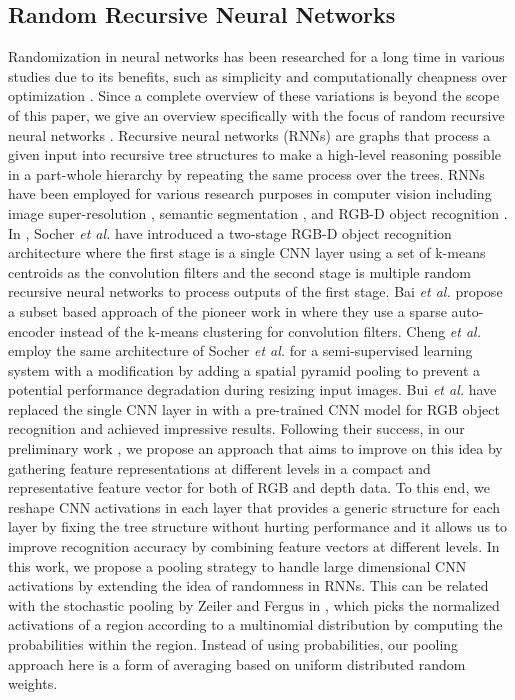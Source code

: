 \documentclass[10pt,journal,compsoc]{IEEEtran}
\begin{document}
\subsection{Random Recursive Neural Networks}
Randomization in neural networks has been researched for a long time in various studies \cite{Schmidt_ICPR_1992, Pao_Computer_1992, Pao_Neurocomp_1994, Igelnik_Pao_TNN_1995, Huang_TNN_2006, Rahimi_NIPS_2008, Socher_NIPS_2012} due to its benefits, such as simplicity and computationally cheapness over optimization \cite{Rahimi_NIPS_2009}. Since a complete overview of these variations is beyond the scope of this paper, we give an overview specifically with the focus of random recursive neural networks \cite{Socher_NIPS_2012}. Recursive neural networks (RNNs) \cite{Pollack_AI_1990, Hinton_AI_1990, Socher_ICML_2011} are graphs that process a given input into recursive tree structures to make a high-level reasoning possible in a part-whole hierarchy by repeating the same process over the trees. RNNs have been employed for various research purposes in computer vision including image super-resolution \cite{Kim_CVPR_2016}, semantic segmentation \cite{Socher_ICML_2011, Sharma_NIPS_2014}, and RGB-D object recognition \cite{Socher_NIPS_2012, Bai_Neurocomp_2015, Cheng_CVIU_2015}. In \cite{Socher_NIPS_2012}, Socher \textit{et al.} have introduced a two-stage RGB-D object recognition architecture where the first stage is a single CNN layer using a set of k-means centroids as the convolution filters and the second stage is multiple random recursive neural networks to process outputs of the first stage. Bai \textit{et al.} \cite{Bai_Neurocomp_2015} propose a subset based approach of the pioneer work in \cite{Socher_NIPS_2012} where they use a sparse auto-encoder instead of the k-means clustering for convolution filters. Cheng \textit{et al.} \cite{Cheng_CVIU_2015} employ the same architecture of Socher \textit{et al.} \cite{Socher_NIPS_2012} for a semi-supervised learning system with a modification by adding a spatial pyramid pooling to prevent a potential performance degradation during resizing input images. Bui \textit{et al.} \cite{Bui_Access_2016} have replaced the single CNN layer in \cite{Socher_NIPS_2012} with a pre-trained CNN model for RGB object recognition and achieved impressive results. Following their success, in our preliminary work \cite{Caglayan_ECCVW_2018}, we propose an approach that aims to improve on this idea by gathering feature representations at different levels in a compact and representative feature vector for both of RGB and depth data. To this end, we reshape CNN activations in each layer that provides a generic structure for each layer by fixing the tree structure without hurting performance and it allows us to improve recognition accuracy by combining feature vectors at different levels. In this work,  we propose a pooling strategy to handle large dimensional CNN activations by extending the idea of randomness in RNNs. This can be related with the stochastic pooling by Zeiler and Fergus in \cite{Zeiler_ICLR_2013}, which picks the normalized activations of a region according to a multinomial distribution by computing the probabilities within the region. Instead of using probabilities, our pooling approach here is a form of averaging based on uniform distributed random weights. 
\end{document}
